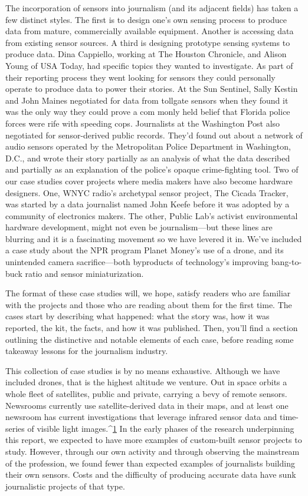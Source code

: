 The incorporation of sensors into journalism (and its adjacent fields) has
taken a few distinct styles. The first is to design one's own sensing process to
produce data from mature, commercially available equipment. Another is
accessing data from existing sensor sources. A third is designing prototype
sensing systems to produce data. Dina Cappiello, working at The Houston
Chronicle, and Alison Young of USA Today, had specific topics they wanted
to investigate. As part of their reporting process they went looking for sensors
they could personally operate to produce data to power their stories. At
the Sun Sentinel, Sally Kestin and John Maines negotiated for data from tollgate
sensors when they found it was the only way they could prove a com
monly held belief that Florida police forces were rife with speeding cops.
Journalists at the Washington Post also negotiated for sensor-derived public
records. They'd found out about a network of audio sensors operated by
the Metropolitan Police Department in Washington, D.C., and wrote their
story partially as an analysis of what the data described and partially as an
explanation of the police's opaque crime-fighting tool. Two of our case studies
cover projects where media makers have also become hardware designers.
One, WNYC radio's archetypal sensor project, The Cicada Tracker, was
started by a data journalist named John Keefe before it was adopted by a
community of electronics makers. The other, Public Lab's activist environmental
hardware development, might not even be journalism—but these
lines are blurring and it is a fascinating movement so we have levered it in.
We've included a case study about the NPR program Planet Money's use of
a drone, and its unintended camera sacrifice—both byproducts of technology's
improving bang-to-buck ratio and sensor miniaturization.

The format of these case studies will, we hope, satisfy readers who are familiar
with the projects and those who are reading about them for the first
time. The cases start by describing what happened: what the story was, how
it was reported, the kit, the facts, and how it was published. Then, you'll find
a section outlining the distinctive and notable elements of each case, before
reading some takeaway lessons for the journalism industry.

This collection of case studies is by no means exhaustive. Although we have
included drones, that is the highest altitude we venture. Out in space orbits
a whole fleet of satellites, public and private, carrying a bevy of remote sensors.
Newsrooms currently use satellite-derived data in their maps, and at
least one newsroom has current investigations that leverage infrared sensor
data and time-series of visible light images.^{\href{#endnotes-case-studies}{1}} In the early phases of the
research underpinning this report, we expected to have more examples of custom-built sensor projects to study. However, through our own activity
and through observing the mainstream of the profession, we found fewer
than expected examples of journalists building their own sensors. Costs and
the difficulty of producing accurate data have sunk journalistic projects of
that type.

